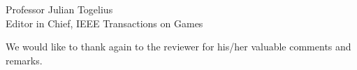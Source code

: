 \documentclass[10pt]{letter} %
\begin{document}
\begin{letter}{Professor Julian Togelius \\ Editor in Chief, IEEE Transactions on Games}
\begin{enumerate}
\begin{itemize}
	\end{itemize}	

We would like to thank again to the reviewer for his/her valuable comments and remarks.

\end{enumerate}
 


\end{letter}
\end{document}

